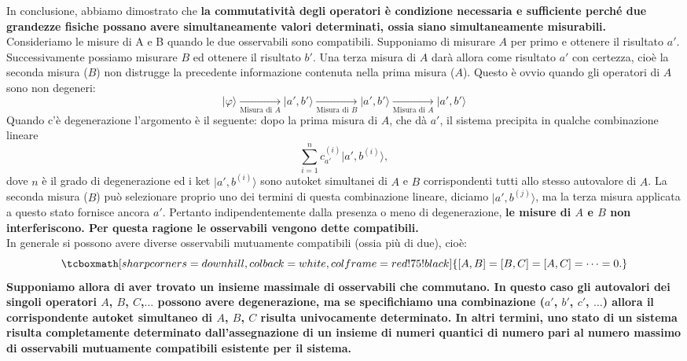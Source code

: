 \documentclass[a4paper,12pt,oneside]{book}
\begin{document}
In conclusione, abbiamo dimostrato che \textbf{la commutatività degli operatori è condizione necessaria e sufficiente perché due grandezze fisiche possano avere simultaneamente valori determinati, ossia siano simultaneamente misurabili.}\\

Consideriamo le misure di A e B quando le due osservabili sono compatibili. Supponiamo di misurare $A$ per primo e ottenere il risultato $a'$. Successivamente possiamo misurare $B$ ed ottenere il risultato $b'$. Una terza misura di $A$ darà allora come risultato $a'$ con certezza, cioè la seconda misura ($B$) non distrugge la precedente informazione contenuta nella prima misura ($A$). Questo è ovvio quando gli operatori di $A$ sono non degeneri:
	\begin{equation}
		\vert \varphi \rangle \xrightarrow[\textrm{Misura di }A]{ } \vert a',b' \rangle \xrightarrow[\textrm{Misura di }B]{ } \vert a',b' \rangle \xrightarrow[\textrm{Misura di }A]{ } \vert a',b' \rangle  
	\end{equation}
Quando c'è degenerazione l'argomento  è il seguente: dopo la prima misura di $A$, che dà $a'$, il sistema precipita in qualche combinazione lineare
	\begin{equation}
		\sum _{i=1} ^n c_{a'} ^{(i)} \vert a', b^{(i)} \rangle ,
	\end{equation}
dove $n$ è il grado di degenerazione ed i ket $\vert a', b^{(i)} \rangle $ sono autoket simultanei di $A$ e $B$ corrispondenti tutti allo stesso autovalore di $A$. La seconda misura ($B$) può selezionare proprio uno dei termini di questa combinazione lineare, diciamo $\vert a', b^{(j)} \rangle $, ma la terza misura applicata a questo stato fornisce ancora $a'$. Pertanto indipendentemente dalla presenza o meno di degenerazione, \textbf{le misure di $A$ e $B$ non interferiscono. Per questa ragione le osservabili vengono dette compatibili.}\\

In generale si possono avere diverse osservabili mutuamente compatibili (ossia più di due), cioè:
	\begin{equation}
		\tcboxmath[sharp corners=downhill ,colback=white,colframe=red!75!black]{
			\left[A,B\right]=\left[B,C\right]=\left[A,C\right]=\dots =0.
			}
	\end{equation}
\textbf{Supponiamo allora di aver trovato un insieme massimale di osservabili che commutano. In questo caso gli autovalori dei singoli operatori $A$, $B$, $C$,$\dots$ possono avere degenerazione, ma se specifichiamo una combinazione ($a'$, $b'$, $c'$, $\dots$) allora il corrispondente autoket simultaneo di $A$, $B$, $C$ risulta univocamente determinato. In altri termini, uno stato di un sistema risulta completamente determinato dall'assegnazione di un insieme di numeri quantici di numero pari al numero massimo di osservabili mutuamente compatibili esistente per il sistema.}
\end{document}
